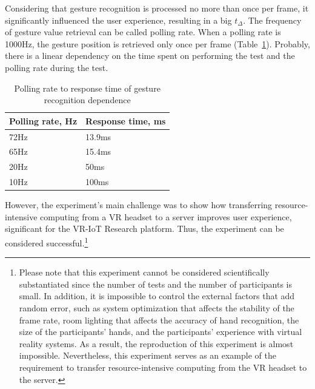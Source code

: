 Considering that gesture recognition is processed no more than once per frame, it significantly influenced the user experience, resulting in a big $t_{\Delta}$. The frequency of gesture value retrieval can be called polling rate. When a polling rate is 1000Hz, the gesture position is retrieved only once per frame (Table~\ref{tab:polling-rate-table}). Probably, there is a linear dependency on the time spent on performing the test and the polling rate during the test.

\begin{table}
  \centering
  \begin{threeparttable}[c]
    \caption{Polling rate to response time of gesture recognition dependence}
    \label{tab:polling-rate-table}
    \begin{tabular}{ll}
      \toprule
      Polling rate, Hz    & Response time, ms                 \\
      \midrule
      72Hz & 13.9ms \\
      65Hz & 15.4ms \\
      20Hz & 50ms \\
      10Hz & 100ms \\
      \bottomrule
    \end{tabular}
  \end{threeparttable}
\end{table}

However, the experiment's main challenge was to show how transferring resource-intensive computing from a VR headset to a server improves user experience, significant for the VR-IoT Research platform. Thus, the experiment can be considered successful.\footnote{Please note that this experiment cannot be considered scientifically substantiated since the number of tests and the number of participants is small. In addition, it is impossible to control the external factors that add random error, such as system optimization that affects the stability of the frame rate, room lighting that affects the accuracy of hand recognition, the size of the participants' hands, and the participants' experience with virtual reality systems. As a result, the reproduction of this experiment is almost impossible. Nevertheless, this experiment serves as an example of the requirement to transfer resource-intensive computing from the VR headset to the server.
}


